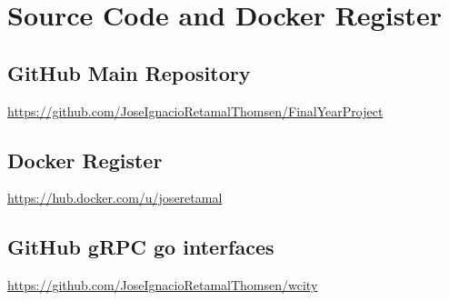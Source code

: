 \chapter{Source Code and Docker Register}

\section{GitHub Main Repository}

\url{https://github.com/JoseIgnacioRetamalThomsen/FinalYearProject}

\section{Docker Register}

\url{https://hub.docker.com/u/joseretamal}

\section{GitHub gRPC go interfaces}

\url {https://github.com/JoseIgnacioRetamalThomsen/wcity}